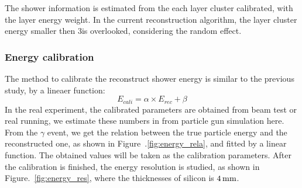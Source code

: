 The shower information is estimated from the each layer cluster calibrated,
with the layer energy weight.
In the current reconstruction algorithm,
the layer cluster energy smaller then 3\mev is overlooked, 
considering the random effect.





\subsubsection{Energy calibration}
The method to calibrate the reconstruct shower energy is similar to the previous study,
by a lineaer function:
\begin{equation}
E_{cali} = \alpha \times E_{rec} + \beta
\end{equation}
In the real experiment, 
the calibrated parameters are obtained from beam test or real running,
we estimate these numbers in from particle gun simulation here.
From the $\gamma$ event, 
we get the relation between the true particle energy and the reconstructed one,
as shown in Figure~.\ref{fig:energy_rela},
and fitted by a linear function.
The obtained values will be taken as the calibration parameters. 
After the calibration is finished, 
the energy resolution is studied, 
as shown in Figure.~\ref{fig:energy_res},
where the thicknesses of silicon is $4\text{\,mm}$.

